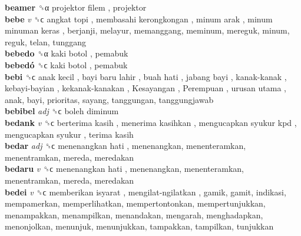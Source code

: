 \textbf{beamer} ␝α   projektor filem , projektor  \\
\textbf{bebe} \emph{v}  ␝ϲ   angkat topi ,  membasahi kerongkongan ,  minum arak ,  minum minuman keras , berjanji, melayur, memanggang, meminum, mereguk, minum, reguk, telan, tunggang  \\
\textbf{bebedo} ␝α   kaki botol , pemabuk  \\
\textbf{bebedó} ␝ϲ   kaki botol , pemabuk  \\
\textbf{bebi} ␝ϲ   anak kecil ,  bayi baru lahir ,  buah hati ,  jabang bayi ,  kanak-kanak ,  kebayi-bayian ,  kekanak-kanakan ,  Kesayangan ,  Perempuan ,  urusan utama , anak, bayi, prioritas, sayang, tanggungan, tanggungjawab  \\
\textbf{bebibel} \emph{adj}  ␝ϲ   boleh diminum   \\
\textbf{bedank} \emph{v}  ␝ϲ   berterima kasih ,  menerima kasihkan ,  mengucapkan syukur kpd ,  mengucapkan syukur ,  terima kasih   \\
\textbf{bedar} \emph{adj}  ␝ϲ   menenangkan hati , menenangkan, menenteramkan, menentramkan, mereda, meredakan  \\
\textbf{bedaru} \emph{v}  ␝ϲ   menenangkan hati , menenangkan, menenteramkan, menentramkan, mereda, meredakan  \\
\textbf{bedei} \emph{v}  ␝ϲ   memberikan isyarat ,  mengilat-ngilatkan , gamik, gamit, indikasi, mempamerkan, memperlihatkan, mempertontonkan, mempertunjukkan, menampakkan, menampilkan, menandakan, mengarah, menghadapkan, menonjolkan, menunjuk, menunjukkan, tampakkan, tampilkan, tunjukkan  \\
